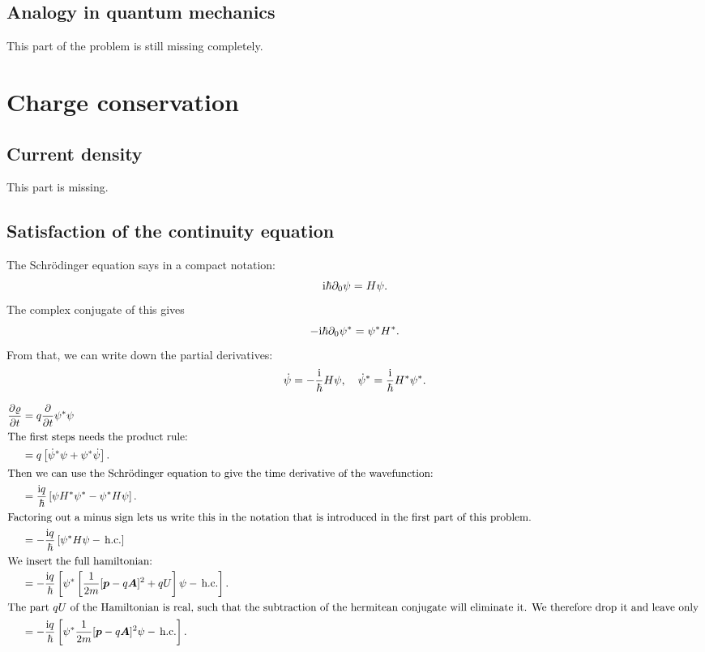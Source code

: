 \documentclass[11pt, english, fleqn, DIV=15, headinclude, BCOR=1cm]{scrartcl}
\begin{document}
\subsection{Analogy in quantum mechanics}

\begin{note}
    This part of the problem is still missing completely.
\end{note}

\section{Charge conservation} %

\newcommand\cc{\mathop{}\text{c.c.}}
\newcommand\hc{\mathop{}\text{h.c.}}

\subsection{Current density}

\begin{note}
    This part is missing.
\end{note}

\subsection{Satisfaction of the continuity equation}

The Schrödinger equation says in a compact notation:
\[
    \mathrm i \hbar \partial_0 \psi = H \psi.
\]
The complex conjugate of this gives
\[
    - \mathrm i \hbar \partial_0 \psi^* = \psi^* H^*.
\]
From that, we can write down the partial derivatives:
\[
    \dot \psi = - \frac{\mathrm i}{\hbar} H \psi
    ,\quad
    \dot \psi^* = \frac{\mathrm i}{\hbar} H^* \psi^*.
\]

\begin{align*}
    \pd{\varrho}{t}
    &= q \pd{}t \psi^* \psi \\
    \intertext{%
        The first steps needs the product rule:
    }
    &= q \sbr{\dot \psi^* \psi + \psi^* \dot \psi}. \\
    \intertext{%
        Then we can use the Schrödinger equation to give the time derivative of
        the wavefunction:
    }
    &= \frac{\iup q}{\hbar} \sbr{\psi H^* \psi^*  - \psi^* H \psi}. \\
    \intertext{%
        Factoring out a minus sign lets us write this in the notation that is
        introduced in the first part of this problem.
    }
    &= - \frac{\iup q}{\hbar} \sbr{ \psi^* H \psi - \hc} \\
    \intertext{%
        We insert the full hamiltonian:
    }
    &= - \frac{\iup q}{\hbar} \sbr{ \psi^* \sbr{\frac{1}{2m} [\vec p - q \vec
    A]^2 + q U} \psi - \hc}. \\
    \intertext{%
        The part $qU$ of the Hamiltonian is real, such that the subtraction of
        the hermitean conjugate will eliminate it. We therefore drop it and
        leave only
    }
    &= - \frac{\iup q}{\hbar} \sbr{ \psi^* \frac{1}{2m} [\vec p - q \vec
    A]^2 \psi - \hc}.
\end{align*}
\end{document}
